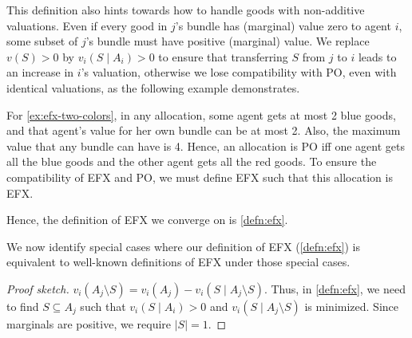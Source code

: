 This definition also hints towards how to handle goods with non-additive valuations.
Even if every good in $j$'s bundle has (marginal) value zero to agent $i$,
some subset of $j$'s bundle must have positive (marginal) value.
We replace $v(S) > 0$ by $v_i(S \mid A_i) > 0$ to ensure that
transferring $S$ from $j$ to $i$ leads to an increase in $i$'s valuation,
otherwise we lose compatibility with PO, even with identical valuations, as the following example demonstrates.


For \cref{ex:efx-two-colors}, in any allocation, some agent gets at most 2 blue goods,
and that agent's value for her own bundle can be at most 2.
Also, the maximum value that any bundle can have is 4.
Hence, an allocation is PO iff one agent gets all the blue goods
and the other agent gets all the red goods.
To ensure the compatibility of EFX and PO, we must define EFX such that this allocation is EFX.

Hence, the definition of EFX we converge on is \cref{defn:efx}.

We now identify special cases where our definition of EFX (\cref{defn:efx})
is equivalent to well-known definitions of EFX under those special cases.

\begin{proof}[Proof sketch]
$v_i(A_j \setminus S) = v_i(A_j) - v_i(S \mid A_j \setminus S)$.
Thus, in \cref{defn:efx}, we need to find $S \subseteq A_j$ such that
$v_i(S \mid A_i) > 0$ and $v_i(S \mid A_j \setminus S)$ is minimized.
Since marginals are positive, we require $|S| = 1$.
\end{proof}

